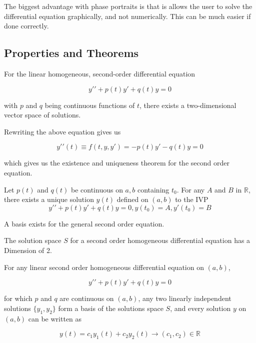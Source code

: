         The biggest advantage with phase portraits is that is allows the user to solve the differential equation graphically, and not numerically. This can be much easier if done correctly.

    \subsection{Properties and Theorems}
    For the linear homogeneous, second-order differential equation

        \[
            y\prime\prime + p(t) y\prime + q(t)y = 0
        \]

    with $p$ and $q$ being continuous functions of $t$, there exists a two-dimensional vector space of solutions.

    Rewriting the above equation gives us

        \[
            y\prime\prime(t) \equiv f(t, y, y\prime) = -p(t) y\prime - q(t) y = 0
        \]

    which gives us the existence and uniqueness theorem for the second order equation.

        \begin{thm}\label{thm:2eau}
            Let $p(t)$ and $q(t)$ be continuous on $a, b$ containing $t_0$. For any $A$ and $B$ in $\mathbb{R}$, there exists a unique solution $y(t)$ defined on $(a, b)$ to the IVP
            \[
            y\prime\prime + p(t) y\prime + q(t)y = 0, y(t_0) = A, y\prime(t_0) = B
            \]
        \end{thm}

    A basis exists for the general second order equation.

        \begin{thm}\label{thm:solutionspace}
            The solution space $S$ for a second order homogeneous differential equation has a Dimension of 2.
        \end{thm}

    For any linear second order homogeneous differential equation on $(a, b)$,

        \[
            y\prime\prime + p(t) y\prime + q(t)y = 0
        \]

    for which $p$ and $q$ are continuous on $(a, b)$, any two linearly independent solutions $\{y_1, y_2\}$ form a basis of the solutions space $S$, and every solution $y$ on $(a, b)$ can be written as

        \[
            y(t) = c_1 y_1(t) + c_2 y_2(t) \to (c_1, c_2) \in \mathbb{R}
        \]

